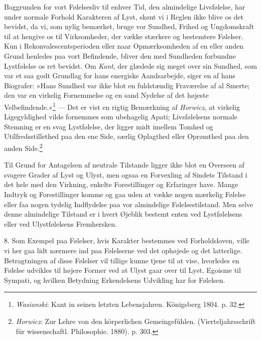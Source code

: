 \documentclass[12pt,a4paper,openany]{book}
\newcommand{\opage}[1]{\marginnote{\footnotesize\textit{[#1]}}}
\begin{document}
Baggrunden for vort Følelsesliv til enhver Tid, den almindelige
Livsfølelse, har under normale Forhold Karakteren af Lyst, skønt vi i
Reglen ikke blive os det bevidst, da vi, som nylig bemærket, bruge vor
Sundhed, Frihed og Ungdomskraft til at hengive os til Virksomheder, der
vække stærkere og bestemtere Følelser. Kun i Rekonvalescentsperioden
eller naar Opmærksomheden af en eller anden Grund henledes paa vort
Befindende, bliver den med Sundheden forbundne Lystfølelse os ret
bevidst. Om \emph{Kant}, der glædede sig meget over sin Sundhed, som var
et saa godt Grundlag for hans energiske Aandsarbejde, siger en af hans
Biografer: »Hans Sundhed var ikke blot en fuldstændig Fraværelse af al
Smerte; den var en virkelig Fornemmelse og en sand Nydelse af det
højeste Velbefindende.«\footnote[2]{\emph{Wasianski}: Kant in seinen
letzten Lebensjahren. Königsberg 1804. p. 32.} --- Det er vist en rigtig
Bemærkning af \emph{Horwicz}, at virkelig Ligegyldighed vilde fornemmes
som ubehagelig Apati; Livsfølelsens normale Stemning er en svag
Lystfølelse, der ligger midt imellem Tomhed og Utilfredsstillethed paa
den ene Side, særlig Oplagthed eller Oprømthed paa den anden
Side.\footnote[3]{\emph{Horwicz}: Zur Lehre von den körperlichen
Gemeingefühlen. (Vierteljahrsschrift für wissenschaftl. Philosophie.
1880). p. 303.}


\opage{341}Til Grund for Antagelsen af neutrale Tilstande ligger ikke
blot en Overseen af svagere Grader af Lyst og Ulyst, men ogsaa en
Forvexling af Sindets Tilstand i det hele med den Virkning, enkelte
Forestillinger og Erfaringer have. Mange Indtryk og Forestillinger komme
og gaa uden at vække nogen mærkelig Følelse eller faa nogen tydelig
Indflydelse paa vor almindelige Følelsestilstand. Men selve denne
almindelige Tilstand er i hvert Øjeblik bestemt enten ved Lystfølelsens
eller ved Ulystfølelsens Fremhersken.

8. Som Exempel paa Følelser, hvis Karakter bestemmes ved Forholdsloven,
ville vi her gaa lidt nærmere ind paa Følelserne ved det ophøjede og det
latterlige. Betragtningen af disse Følelser vil tillige kunne tjene til
at vise, hvorledes en Følelse udvikles til højere Former ved at Ulyst
gaar over til Lyst, Egoisme til Sympati, og hvilken Betydning
Erkendelsens Udvikling har for Følelsen.
\end{document}
